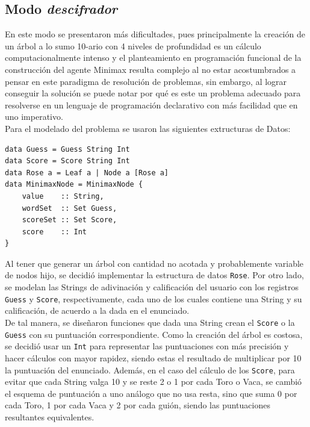 \documentclass[11pt]{article}
\begin{document}
\subsection{Modo \emph{descifrador}}

En este modo se presentaron más dificultades, pues principalmente la creación 
de un árbol a lo sumo 10-ario con 4 niveles de profundidad es un cálculo
computacionalmente intenso y el planteamiento en programación funcional de la
construcción del agente Minimax resulta complejo al no estar acostumbrados a
pensar en este paradigma de resolución de problemas, sin embargo, al lograr
conseguir la solución se puede notar por qué es este un problema adecuado para
resolverse en un lenguaje de programación declarativo con más facilidad que en uno imperativo. \\

Para el modelado del problema se usaron las siguientes extructuras de Datos:

\begin{verbatim}
data Guess = Guess String Int
data Score = Score String Int
data Rose a = Leaf a | Node a [Rose a]
data MinimaxNode = MinimaxNode {
    value    :: String,
    wordSet  :: Set Guess,
    scoreSet :: Set Score,
    score    :: Int
} 
\end{verbatim}

Al tener que generar un árbol con cantidad no acotada y probablemente variable
de nodos hijo, se decidió implementar la estructura de datos \texttt{Rose}. Por
otro lado, se modelan las Strings de adivinación y calificación del usuario con
los registros \texttt{Guess} y \texttt{Score}, respectivamente, cada uno de los
cuales contiene una String y su calificación, de acuerdo a la dada en el enunciado. \\

De tal manera, se diseñaron funciones que dada una String crean el
\texttt{Score} o la \texttt{Guess} con su puntuación correspondiente. Como la
creación del árbol es costosa, se decidió usar un \texttt{Int} para representar las 
puntuaciones con más precisión y hacer cálculos con mayor rapidez, siendo estas el
resultado de multiplicar por 10 la puntuación del enunciado. Además, en el caso del
cálculo de los \texttt{Score}, para evitar que cada String valga 10 y se reste 2 o 1
por cada Toro o Vaca, se cambió el esquema de puntuación a uno análogo que no usa
resta, sino que suma 0 por cada Toro, 1 por cada Vaca y 2 por cada guión, siendo
las puntuaciones resultantes equivalentes. \\
\end{document}
